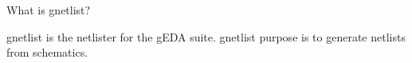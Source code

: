  What is gnetlist? 

  gnetlist is the netlister for the gEDA suite. gnetlist purpose is to generate netlists from schematics.

